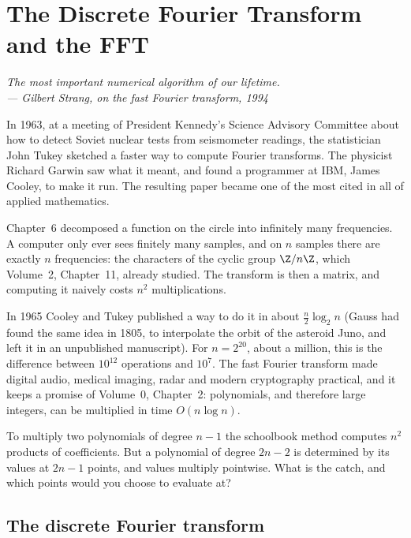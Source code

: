 \chapter{The Discrete Fourier Transform and the FFT}

\begin{center}\itshape
The most important numerical algorithm of our lifetime.\\
\upshape --- Gilbert Strang, on the fast Fourier transform, 1994
\end{center}

In 1963, at a meeting of President Kennedy's Science Advisory Committee about how to detect Soviet nuclear tests from seismometer readings, the
statistician John Tukey sketched a faster way to compute Fourier transforms. The physicist Richard Garwin saw what it meant, and found a programmer at
IBM, James Cooley, to make it run. The resulting paper became one of the most cited in all of applied mathematics.

Chapter~6 decomposed a function on the circle into infinitely many frequencies. A computer only ever sees finitely many
samples, and on $n$ samples there are exactly $n$ frequencies: the characters of the cyclic group $\Z/n\Z$, which Volume~2,
Chapter~11, already studied. The transform is then a matrix, and computing it naively costs $n^2$ multiplications.

In 1965 Cooley and Tukey published a way to do it in about $\frac n2\log_2n$ (Gauss had found the same idea in 1805, to
interpolate the orbit of the asteroid Juno, and left it in an unpublished manuscript). For $n=2^{20}$, about a million,
this is the difference between $10^{12}$ operations and $10^7$. The fast Fourier transform made digital audio, medical
imaging, radar and modern cryptography practical, and it keeps a promise of Volume~0, Chapter~2: polynomials, and
therefore large integers, can be multiplied in time $O(n\log n)$.

\begin{think}
To multiply two polynomials of degree $n-1$ the schoolbook method computes $n^2$ products of coefficients. But a polynomial of
degree $2n-2$ is determined by its values at $2n-1$ points, and values multiply pointwise. What is the catch, and which points
would you choose to evaluate at?
\end{think}

\section{The discrete Fourier transform}

